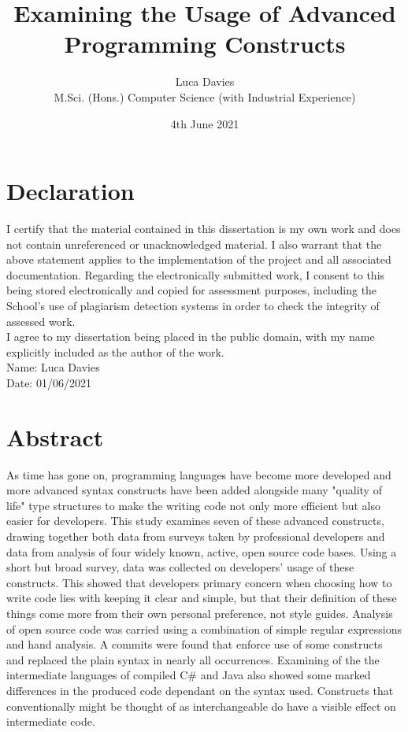 \documentclass{article}
\title{\textbf{Examining the Usage of Advanced Programming Constructs}}
\author{
Luca Davies \\ M.Sci. (Hons.) Computer Science (with Industrial Experience)}
\date{4th June 2021}
\begin{document}
\maketitle

\newpage
\section*{Declaration}
    I certify that the material contained in this dissertation is my own work and does not contain unreferenced or unacknowledged material. I also warrant that the above statement applies to the implementation of the project and all associated documentation. Regarding the electronically submitted work, I consent to this being stored electronically and copied for assessment purposes, including the School’s use of plagiarism detection systems in order to check the integrity of assessed work. \\
    I agree to my dissertation being placed in the public domain, with my name explicitly included as the author of the work. \\
    
    \noindent
    Name: Luca Davies\\
    Date: 01/06/2021
\newpage
\section*{Abstract}
    As time has gone on, programming languages have become more developed and more advanced syntax constructs have been added alongside many "quality of life" type structures to make the writing code not only more efficient but also easier for developers. This study examines seven of these advanced constructs, drawing together both data from surveys taken by professional developers and data from analysis of four widely known, active, open source code bases. Using a short but broad survey, data was collected on developers' usage of these constructs. This showed that developers primary concern when choosing how to write code lies with keeping it clear and simple, but that their definition of these things come more from their own personal preference, not style guides. Analysis of open source code was carried using a combination of simple regular expressions and hand analysis. A commits were found that enforce use of some constructs and replaced the plain syntax in nearly all occurrences. Examining of the the intermediate languages of compiled C\# and Java also showed some marked differences in the produced code dependant on the syntax used. Constructs that conventionally might be thought of as interchangeable do have a visible effect on intermediate code.
    \newline
    \newline
\newpage
\tableofcontents
\end{document}
